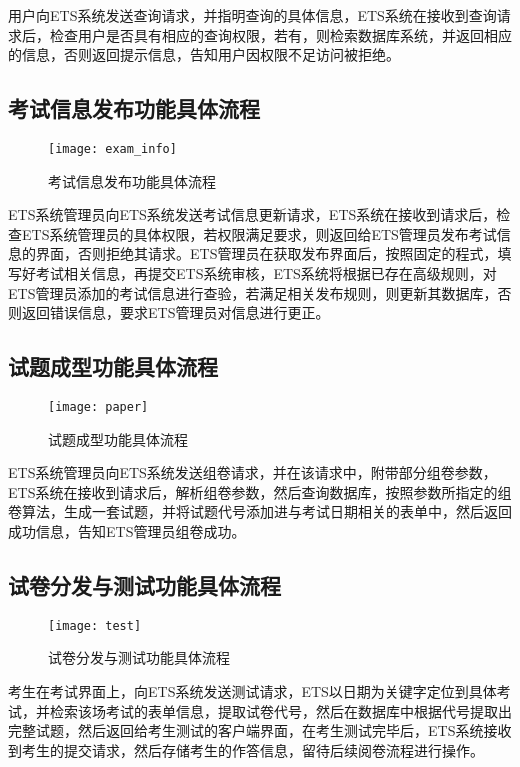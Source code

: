 用户向ETS系统发送查询请求，并指明查询的具体信息，ETS系统在接收到查询请求后，检查用户是否具有相应的查询权限，若有，则检索数据库系统，并返回相应的信息，否则返回提示信息，告知用户因权限不足访问被拒绝。

\subsection{考试信息发布功能具体流程}
\begin{figure}[ht]
\centering
\texttt{[image: exam\_info]}
\caption{考试信息发布功能具体流程} \label{fig:figure1}
\end{figure}

ETS系统管理员向ETS系统发送考试信息更新请求，ETS系统在接收到请求后，检查ETS系统管理员的具体权限，若权限满足要求，则返回给ETS管理员发布考试信息的界面，否则拒绝其请求。ETS管理员在获取发布界面后，按照固定的程式，填写好考试相关信息，再提交ETS系统审核，ETS系统将根据已存在高级规则，对ETS管理员添加的考试信息进行查验，若满足相关发布规则，则更新其数据库，否则返回错误信息，要求ETS管理员对信息进行更正。

\subsection{试题成型功能具体流程}
\begin{figure}[ht]
\centering
\texttt{[image: paper]}
\caption{试题成型功能具体流程} \label{fig:figure1}
\end{figure}

ETS系统管理员向ETS系统发送组卷请求，并在该请求中，附带部分组卷参数，ETS系统在接收到请求后，解析组卷参数，然后查询数据库，按照参数所指定的组卷算法，生成一套试题，并将试题代号添加进与考试日期相关的表单中，然后返回成功信息，告知ETS管理员组卷成功。

\subsection{试卷分发与测试功能具体流程}
\begin{figure}[ht]
\centering
\texttt{[image: test]}
\caption{试卷分发与测试功能具体流程} \label{fig:figure1}
\end{figure}

考生在考试界面上，向ETS系统发送测试请求，ETS以日期为关键字定位到具体考试，并检索该场考试的表单信息，提取试卷代号，然后在数据库中根据代号提取出完整试题，然后返回给考生测试的客户端界面，在考生测试完毕后，ETS系统接收到考生的提交请求，然后存储考生的作答信息，留待后续阅卷流程进行操作。

